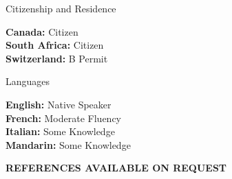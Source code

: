 \documentclass{cv}
\begin{document}

\begin{rSection}{Citizenship and Residence}

{\bf Canada:} Citizen \vspace{0.2em}\\
{\bf South Africa:} Citizen \vspace{0.2em}\\
{\bf Switzerland:} B Permit

\end{rSection}


\begin{rSection}{Languages}

{\bf English:} Native Speaker \vspace{0.2em}\\
{\bf French:} Moderate Fluency \vspace{0.2em}\\
{\bf Italian:} Some Knowledge \vspace{0.2em}\\
{\bf Mandarin:} Some Knowledge

\end{rSection}


\vfill
\begin{center}
    \large{\MakeUppercase{\bf References Available On Request}}
\end{center}
\end{document}
